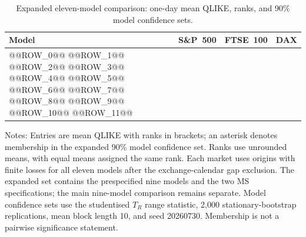 \begin{table}[htbp]
\centering
\begin{threeparttable}
\caption{Expanded eleven-model comparison: one-day mean QLIKE, ranks, and 90\% model confidence sets.}
\label{tab:oa-expanded-ms}
\scriptsize
\setlength{\tabcolsep}{5pt}
\begin{tabular*}{\textwidth}{@{\extracolsep{\fill}}lrrr@{}}
\toprule
Model & S\&P~500 & FTSE~100 & DAX \\
\midrule
@@ROW_0@@
@@ROW_1@@
@@ROW_2@@
@@ROW_3@@
@@ROW_4@@
@@ROW_5@@
@@ROW_6@@
@@ROW_7@@
@@ROW_8@@
@@ROW_9@@
@@ROW_10@@
\midrule
@@ROW_11@@
\bottomrule
\end{tabular*}
\begin{tablenotes}[flushleft]
\footnotesize
\item Notes: Entries are mean QLIKE with ranks in brackets; an asterisk denotes membership in the expanded 90\% model confidence set. Ranks use unrounded means, with equal means assigned the same rank. Each market uses origins with finite losses for all eleven models after the exchange-calendar gap exclusion. The expanded set contains the prespecified nine models and the two MS specifications; the main nine-model comparison remains separate. Model confidence sets use the studentised $T_R$ range statistic, 2,000 stationary-bootstrap replications, mean block length 10, and seed 20260730. Membership is not a pairwise significance statement.
\end{tablenotes}
\end{threeparttable}
\end{table}

